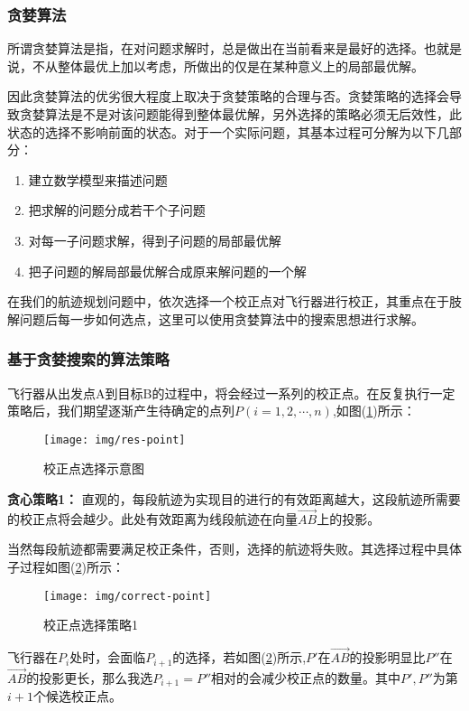 \subsubsection{贪婪算法\cite{tanlan}}
所谓贪婪算法是指，在对问题求解时，总是做出在当前看来是最好的选择。也就是说，不从整体最优上加以考虑，所做出的仅是在某种意义上的局部最优解。

因此贪婪算法的优劣很大程度上取决于贪婪策略的合理与否。贪婪策略的选择会导致贪婪算法是不是对该问题能得到整体最优解，另外选择的策略必须无后效性，此状态的选择不影响前面的状态。对于一个实际问题，其基本过程可分解为以下几部分：
\begin{enumerate}
    \item 建立数学模型来描述问题
    \item 把求解的问题分成若干个子问题
    \item 对每一子问题求解，得到子问题的局部最优解
    \item 把子问题的解局部最优解合成原来解问题的一个解
\end{enumerate}

在我们的航迹规划问题中，依次选择一个校正点对飞行器进行校正，其重点在于肢解问题后每一步如何选点，这里可以使用贪婪算法中的搜索思想进行求解。

\subsubsection{基于贪婪搜索的算法策略}\label{sec:tanlan}
飞行器从出发点A到目标B的过程中，将会经过一系列的校正点。在反复执行一定策略后，我们期望逐渐产生待确定的点列$P (i = 1,2,\cdots,n)$,如图(\ref{fig:res-point})所示：
\begin{figure}[h]
    \centering
    \texttt{[image: img/res-point]}
    \caption{校正点选择示意图}
    \label{fig:res-point}
\end{figure}

\noindent \textbf{贪心策略1：}
直观的，每段航迹为实现目的进行的有效距离越大，这段航迹所需要的校正点将会越少。此处有效距离为线段航迹在向量$\overrightarrow{AB}$上的投影。

当然每段航迹都需要满足校正条件，否则，选择的航迹将失败。其选择过程中具体子过程如图(\ref{fig:correct-point})所示：
\begin{figure}[h]
    \centering
    \texttt{[image: img/correct-point]}
    \caption{校正点选择策略1}
    \label{fig:correct-point}
\end{figure}

飞行器在$P_i$处时，会面临$P_{i+1}$的选择，若如图(\ref{fig:correct-point})所示,$P'$在$\overrightarrow{AB} $的投影明显比$P''$在$\overrightarrow{AB} $的投影更长，那么我选$P_{i+1} = P''$相对的会减少校正点的数量。其中$P',P''$为第$i+1$个候选校正点。

